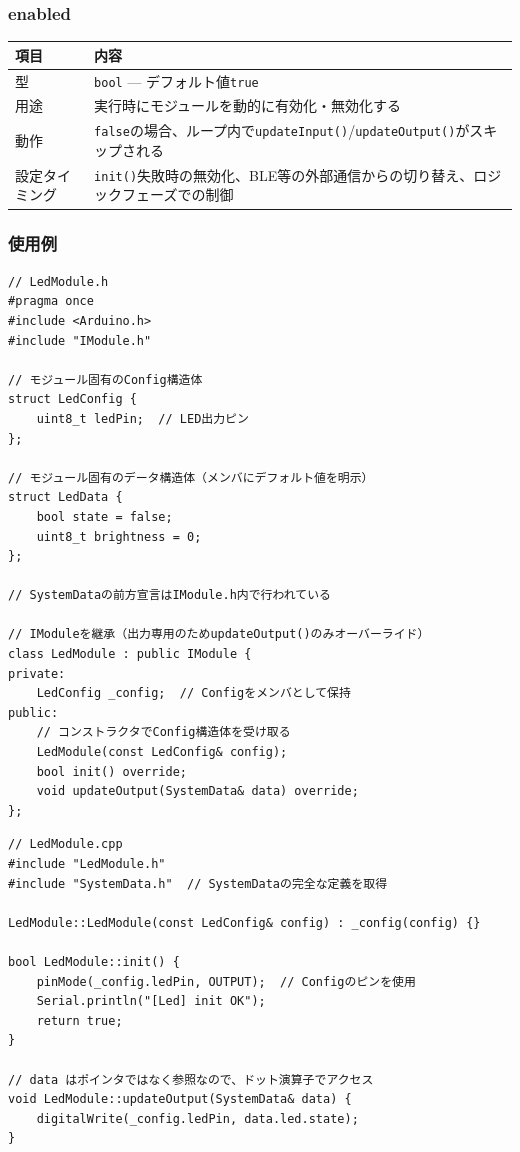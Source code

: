 \subsubsection{enabled}

\begin{tabularx}{\textwidth}{l X}
\toprule
\textbf{項目} & \textbf{内容} \\
\midrule
型 & \texttt{bool} — デフォルト値\texttt{true} \\
用途 & 実行時にモジュールを動的に有効化・無効化する \\
動作 & \texttt{false}の場合、ループ内で\texttt{updateInput()}/\texttt{updateOutput()}がスキップされる \\
設定タイミング & \texttt{init()}失敗時の無効化、BLE等の外部通信からの切り替え、ロジックフェーズでの制御 \\
\bottomrule
\end{tabularx}

\subsubsection{使用例}

\begin{lstlisting}[style=cppstyle, caption={出力モジュールの例（ヘッダー）}]
// LedModule.h
#pragma once
#include <Arduino.h>
#include "IModule.h"

// モジュール固有のConfig構造体
struct LedConfig {
    uint8_t ledPin;  // LED出力ピン
};

// モジュール固有のデータ構造体（メンバにデフォルト値を明示）
struct LedData {
    bool state = false;
    uint8_t brightness = 0;
};

// SystemDataの前方宣言はIModule.h内で行われている

// IModuleを継承（出力専用のためupdateOutput()のみオーバーライド）
class LedModule : public IModule {
private:
    LedConfig _config;  // Configをメンバとして保持
public:
    // コンストラクタでConfig構造体を受け取る
    LedModule(const LedConfig& config);
    bool init() override;
    void updateOutput(SystemData& data) override;
};
\end{lstlisting}

\begin{lstlisting}[style=cppstyle, caption={出力モジュールの例（実装ファイル）}]
// LedModule.cpp
#include "LedModule.h"
#include "SystemData.h"  // SystemDataの完全な定義を取得

LedModule::LedModule(const LedConfig& config) : _config(config) {}

bool LedModule::init() {
    pinMode(_config.ledPin, OUTPUT);  // Configのピンを使用
    Serial.println("[Led] init OK");
    return true;
}

// data はポインタではなく参照なので、ドット演算子でアクセス
void LedModule::updateOutput(SystemData& data) {
    digitalWrite(_config.ledPin, data.led.state);
}
\end{lstlisting}

